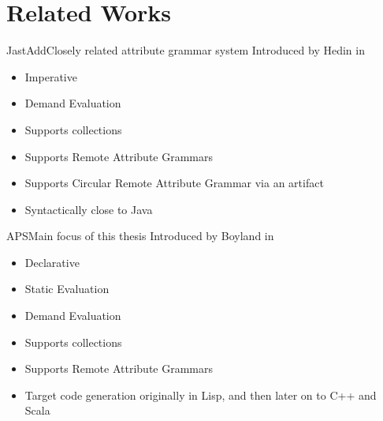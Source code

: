 \section{Related Works}

\begin{frame}{JastAdd}{Closely related attribute grammar system}
Introduced by Hedin in \cite{DBLP:journals/entcs/HedinM01}
		
\begin{itemize}
    \item \alert{Imperative}
    \item Demand Evaluation
    \item Supports collections
    \item Supports Remote Attribute Grammars
    \item \alert{Supports Circular Remote Attribute Grammar} via an artifact
    \item Syntactically close to Java
\end{itemize}

\end{frame}


\begin{frame}{APS}{Main focus of this thesis}
Introduced by Boyland in \cite{10.5555/924544}
		
\begin{itemize}
    \item \alert{Declarative}
    \item \alert{Static Evaluation}
    \item Demand Evaluation
    \item Supports collections
    \item Supports Remote Attribute Grammars
    \item Target code generation originally in Lisp, and then later on to C++ and Scala
\end{itemize}

\end{frame}


